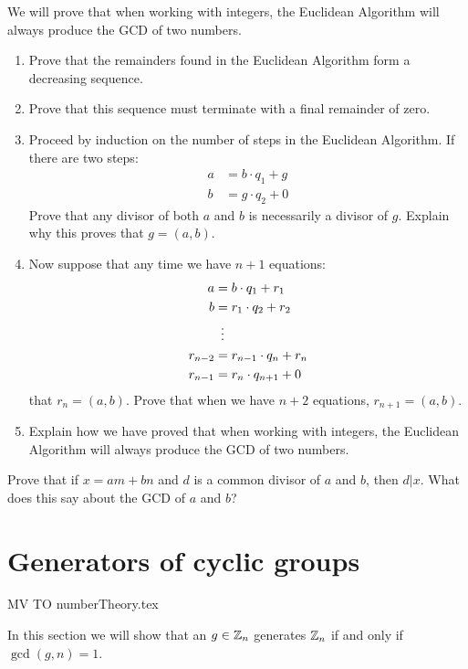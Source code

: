 \documentclass{ximera}
\begin{document}
\begin{exercise} 
We will prove that when working with integers, the Euclidean Algorithm
will always produce the GCD of two numbers.
\begin{enumerate}
\item Prove that the remainders found in the Euclidean Algorithm form a
  decreasing sequence.
\item Prove that this sequence must terminate with a final remainder
  of zero.
\item Proceed by induction on the number of steps in the Euclidean
  Algorithm. If there are two steps:
\begin{align*}
a &= b\cdot q_1 + g \\
b &= g\cdot q_2 +0
\end{align*}
Prove that any divisor of both $a$ and $b$ is necessarily a divisor
of $g$. Explain why this proves that $g = (a,b)$.
\item Now suppose that any time we have $n+1$ equations:
\begin{align*}
a &= b\cdot q_1 + r_1 \\
b &= r_1\cdot q_2 + r_2 \\
  &\hspace{.5em}\vdots\\
r_{n-2} &= r_{n-1}\cdot q_{n} + r_n\\
r_{n-1} &= r_{n}\cdot q_{n+1} + 0
\end{align*}
that $r_n = (a,b)$. Prove that when we have $n+2$ equations, $r_{n+1}
= (a,b)$.
\item Explain how we have proved that when working with integers, the
  Euclidean Algorithm will always produce the GCD of two numbers.
\end{enumerate}
\end{exercise}


\begin{exercise} 
Prove that if $x = am +bn$ and $d$ is a common divisor of $a$ and $b$,
then $d|x$. What does this say about the GCD of $a$ and $b$?
\end{exercise}



\section{Generators of cyclic groups}


MV TO numberTheory.tex




In this section we will show that an $g\in \mathbb Z_n$ generates $\mathbb Z_n$ if
and only if $\gcd(g,n) = 1$.
\end{document}
